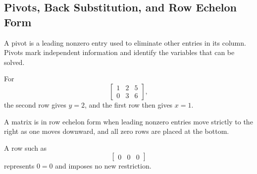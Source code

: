 \subsection{Pivots, Back Substitution, and Row Echelon Form}

A pivot is a leading nonzero entry used to eliminate other entries in its column. Pivots mark independent information and identify the variables that can be solved.

\begin{examplebox}
For
\[
\left[\begin{array}{cc|c}
1&2&5\\
0&3&6
\end{array}\right],
\]
the second row gives $y=2$, and the first row then gives $x=1$.
\end{examplebox}

\begin{definitionbox}
A matrix is in row echelon form when leading nonzero entries move strictly to the right as one moves downward, and all zero rows are placed at the bottom.
\end{definitionbox}

A row such as
\[
\left[\begin{array}{cc|c}0&0&0\end{array}\right]
\]
represents $0=0$ and imposes no new restriction.